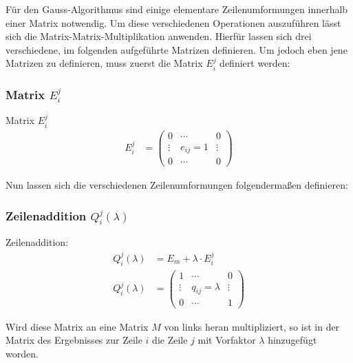 
Für den Gauss-Algorithmus sind einige elementare Zeilenumformungen innerhalb einer Matrix notwendig.
Um diese verschiedenen Operationen auszuführen lässt sich die Matrix-Matrix-Multiplikation anwenden. Hierfür lassen sich drei verschiedene, im folgenden aufgeführte Matrizen definieren.
Um jedoch eben jene Matrizen zu definieren, muss zuerst die Matrix $E^j_i$ definiert werden:

\subsubsection{Matrix $E^j_i$}
\begin{Def} Matrix $E^j_i$
\begin{align*}
 	E^j_i &=
	 	\begin{pmatrix}
	 	0 & \cdots & 0 \\
	 	\vdots & e_{ij} = 1 & \vdots \\
	 	0 & \cdots & 0 
 	\end{pmatrix}
\end{align*}
\end{Def}

\vspace{8pt}

\raggedright Nun lassen sich die verschiedenen Zeilenumformungen folgendermaßen definieren:
\subsubsection{Zeilenaddition $Q^j_i(\lambda)$}
\begin{Def} Zeilenaddition:
\begin{align*}
	Q^j_i(\lambda) & = E_m + \lambda \cdot E^j_i \\
	Q^j_i(\lambda) & = 
	\begin{pmatrix}
	1 & \cdots & 0 \\ 
	\vdots &  q_{ij} = \lambda & \vdots \\  
	0 & \cdots & 1
	\end{pmatrix} 
\end{align*}
\end{Def}
\raggedright
Wird diese Matrix an eine Matrix $M$ von links heran multipliziert, so ist in der Matrix des Ergebnisses zur Zeile $i$ die Zeile $j$ mit Vorfaktor $\lambda$ hinzugefügt worden.

